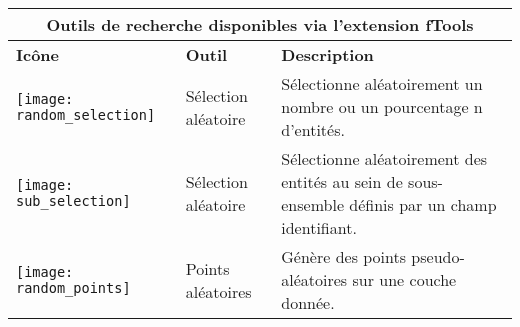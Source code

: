 \begin{table}[ht]
\centering
 \begin{tabular}{|m{1cm}|m{3cm}|m{12cm}|}
 \hline \multicolumn{3}{|c|}{\textbf{Outils de recherche disponibles via l'extension fTools}} \\ 
 \hline \textbf{Icône} & \textbf{Outil} & \textbf{Description} \\
 \hline \texttt{[image: random\_selection]} & Sélection aléatoire & Sélectionne aléatoirement un nombre ou un pourcentage n d'entités. \\
 \hline \texttt{[image: sub\_selection]} & Sélection aléatoire  & Sélectionne aléatoirement des entités au sein de sous-ensemble définis par un champ identifiant. \\
 \hline \texttt{[image: random\_points]} & Points aléatoires & Génère des points pseudo-aléatoires sur une couche donnée. \\

\end{tabular}
\end{table}
